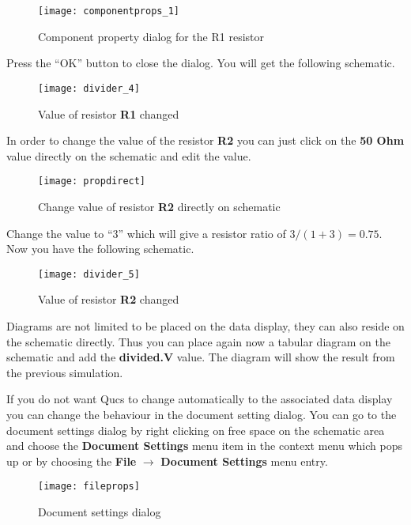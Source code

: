 \begin{figure}[ht]
  \centering
  \texttt{[image: componentprops\_1]}
  \caption{Component property dialog for the R1 resistor}
  \label{fig:componentprops_1}
\end{figure}
\FloatBarrier

Press the ``OK'' button to close the dialog.  You will get the
following schematic.

\begin{figure}[ht]
  \centering
  \texttt{[image: divider\_4]}
  \caption{Value of resistor \textbf{R1} changed}
  \label{fig:divider_4}
\end{figure}
\FloatBarrier

In order to change the value of the resistor \textbf{R2} you can just
click on the \textbf{50 Ohm} value directly on the schematic and edit
the value.

\begin{figure}[ht]
  \centering
  \texttt{[image: propdirect]}
  \caption{Change value of resistor \textbf{R2} directly on schematic}
  \label{fig:propdirect}
\end{figure}
\FloatBarrier

Change the value to ``3'' which will give a resistor ratio of $3/(1+3)
= 0.75$.  Now you have the following schematic.

\begin{figure}[ht]
  \centering
  \texttt{[image: divider\_5]}
  \caption{Value of resistor \textbf{R2} changed}
  \label{fig:divider_5}
\end{figure}
\FloatBarrier

Diagrams are not limited to be placed on the data display, they can
also reside on the schematic directly.  Thus you can place again now a
tabular diagram on the schematic and add the \textbf{divided.V} value.
The diagram will show the result from the previous simulation.


If you do not want Qucs to change automatically to the associated data
display you can change the behaviour in the document setting dialog.
You can go to the document settings dialog by right clicking on free
space on the schematic area and choose the \textbf{Document Settings}
menu item in the context menu which pops up or by choosing the
\textbf{File} $\rightarrow$ \textbf{Document Settings} menu entry.

\begin{figure}[ht]
  \centering
  \texttt{[image: fileprops]}
  \caption{Document settings dialog}
  \label{fig:fileprops}
\end{figure}
\FloatBarrier

